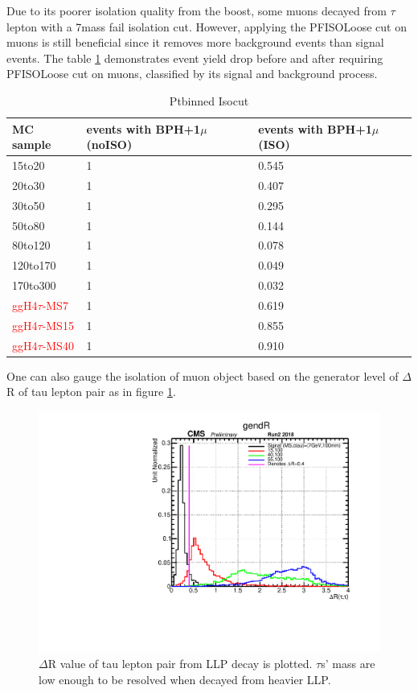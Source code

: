 Due to its poorer isolation quality from the boost, some muons decayed from $\tau$ lepton with a 7\GeV mass fail isolation cut.
However, applying the PFISOLoose cut on muons is still beneficial since it removes more background events than signal events.
The table \ref{tab:ISOeff} demonstrates event yield drop before and after requiring PFISOLoose cut on muons, classified by its signal and background process.


\begin{tiny}
    \begin{table}
  \centering
\begin{tabular}{|p{3cm}|p{2cm}|p{2cm}|}
\hline
MC sample & events with BPH+1$\mu$ (noISO) & events with BPH+1$\mu$ (ISO) \\
\hline
 15to20 & 1 & 0.545 \\
 \hline
 20to30 & 1 & 0.407 \\
\hline
 30to50 & 1 & 0.295 \\
\hline
 50to80 & 1 & 0.144 \\
\hline
 80to120 & 1 & 0.078 \\
\hline
120to170 & 1 & 0.049 \\
\hline
170to300 & 1 & 0.032 \\
\hline
\textcolor{red}{ggH4$\tau$-MS7}& 1 & 0.619 \\
\hline
\textcolor{red}{ggH4$\tau$-MS15} & 1 & 0.855 \\
\hline
\textcolor{red}{ggH4$\tau$-MS40} & 1 & 0.910 \\
 \hline
    \end{tabular}
    \caption{Ptbinned Isocut}
\label{tab:ISOeff}
    \end{table}
\end{tiny}    

One can also gauge the isolation of muon object based on the generator level of $\Delta$R of tau lepton pair as in figure \ref{fig:taudeltaR}.
 \begin{figure}[h!]
   \caption{$\Delta$R value of tau lepton pair from LLP decay is plotted. $\tau$s' mass are low enough to be resolved when decayed from heavier LLP.}
   \label{fig:taudeltaR}
   \centering
   \includegraphics[width=0.60\linewidth]{figs/taugendR.pdf}
 \end{figure}






